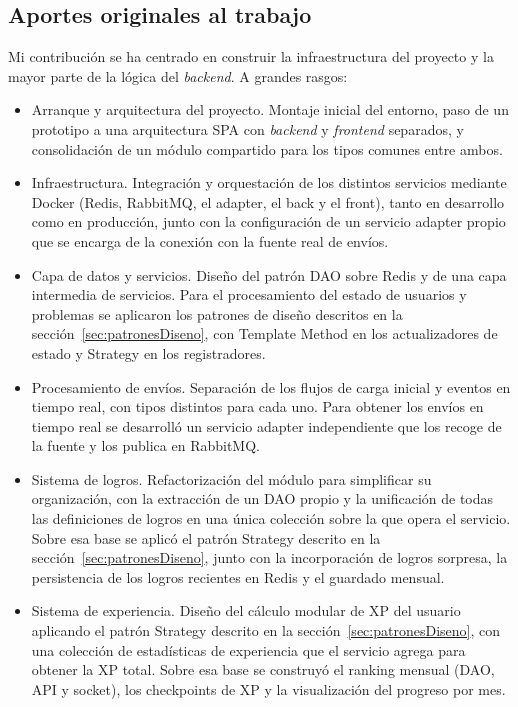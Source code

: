 \subsection*{Aportes originales al trabajo}

Mi contribución se ha centrado en construir la infraestructura del proyecto y la mayor parte de la lógica del \textit{backend}. A grandes rasgos:

\begin{itemize}
    \item Arranque y arquitectura del proyecto. Montaje inicial del entorno, paso de un prototipo a una arquitectura SPA con \textit{backend} y \textit{frontend} separados, y consolidación de un módulo compartido para los tipos comunes entre ambos.
    \item Infraestructura. Integración y orquestación de los distintos servicios mediante Docker (Redis, RabbitMQ, el adapter, el back y el front), tanto en desarrollo como en producción, junto con la configuración de un servicio adapter propio que se encarga de la conexión con la fuente real de envíos.
    \item Capa de datos y servicios. Diseño del patrón DAO sobre Redis y de una capa intermedia de servicios. Para el procesamiento del estado de usuarios y problemas se aplicaron los patrones de diseño descritos en la sección~\ref{sec:patronesDiseno}, con Template Method en los actualizadores de estado y Strategy en los registradores.
    \item Procesamiento de envíos. Separación de los flujos de carga inicial y eventos en tiempo real, con tipos distintos para cada uno. Para obtener los envíos en tiempo real se desarrolló un servicio adapter independiente que los recoge de la fuente y los publica en RabbitMQ.
    \item Sistema de logros. Refactorización del módulo para simplificar su organización, con la extracción de un DAO propio y la unificación de todas las definiciones de logros en una única colección sobre la que opera el servicio. Sobre esa base se aplicó el patrón Strategy descrito en la sección~\ref{sec:patronesDiseno}, junto con la incorporación de logros sorpresa, la persistencia de los logros recientes en Redis y el guardado mensual.
    \item Sistema de experiencia. Diseño del cálculo modular de XP del usuario aplicando el patrón Strategy descrito en la sección~\ref{sec:patronesDiseno}, con una colección de estadísticas de experiencia que el servicio agrega para obtener la XP total. Sobre esa base se construyó el ranking mensual (DAO, API y socket), los checkpoints de XP y la visualización del progreso por mes.

\end{itemize}
